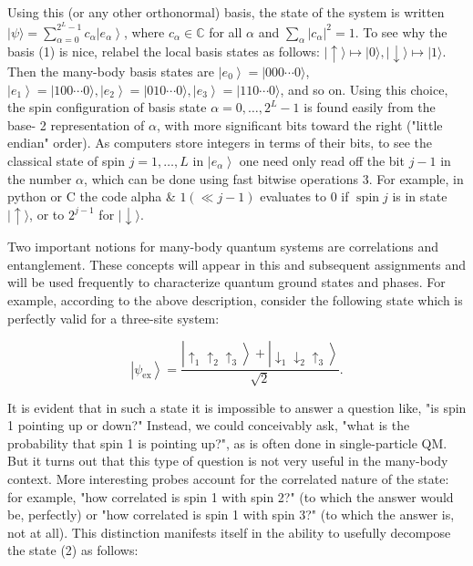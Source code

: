 \documentclass[10pt]{article}
\begin{document}
Using this (or any other orthonormal) basis, the state of the system is written $|\psi\rangle=\sum_{\alpha=0}^{2^{L}-1} c_{\alpha}\left|e_{\alpha}\right\rangle$, where $c_{\alpha} \in \mathbb{C}$ for all $\alpha$ and $\sum_{\alpha}\left|c_{\alpha}\right|^{2}=1$. To see why the basis (1) is nice, relabel the local basis states as follows: $|\uparrow\rangle \mapsto|0\rangle,|\downarrow\rangle \mapsto|1\rangle$. Then the many-body basis states are $\left|e_{0}\right\rangle=|000 \cdots 0\rangle$, $\left|e_{1}\right\rangle=|100 \cdots 0\rangle,\left|e_{2}\right\rangle=|010 \cdots 0\rangle,\left|e_{3}\right\rangle=|110 \cdots 0\rangle$, and so on. Using this choice, the spin configuration of basis state $\alpha=0, \ldots, 2^{L}-1$ is found easily from the base- 2 representation of $\alpha$, with more significant bits toward the right ("little endian" order). As computers store integers in terms of their bits, to see the classical state of spin $j=1, \ldots, L$ in $\left|e_{\alpha}\right\rangle$ one need only read off the bit $j-1$ in the number $\alpha$, which can be done using fast bitwise operations 3. For example, in python or $\mathrm{C}$ the code alpha \& $1(\ll j-1)$ evaluates to 0 if $\operatorname{spin} j$ is in state $|\uparrow\rangle$, or to $2^{j-1}$ for $|\downarrow\rangle$.

Two important notions for many-body quantum systems are correlations and entanglement. These concepts will appear in this and subsequent assignments and will be used frequently to characterize quantum ground states and phases. For example, according to the above description, consider the following state which is perfectly valid for a three-site system:


\begin{equation*}
\left|\psi_{\mathrm{ex}}\right\rangle=\frac{\left|\uparrow_{1} \uparrow_{2} \uparrow_{3}\right\rangle+\left|\downarrow_{1} \downarrow_{2} \uparrow_{3}\right\rangle}{\sqrt{2}} . \tag{2}
\end{equation*}


It is evident that in such a state it is impossible to answer a question like, "is spin 1 pointing up or down?" Instead, we could conceivably ask, "what is the probability that spin 1 is pointing up?", as is often done in single-particle QM. But it turns out that this type of question is not very useful in the many-body context. More interesting probes account for the correlated nature of the state: for example, "how correlated is spin 1 with spin 2?" (to which the answer would be, perfectly) or "how correlated is spin 1 with spin 3?" (to which the answer is, not at all). This distinction manifests itself in the ability to usefully decompose the state (2) as follows:
\end{document}
